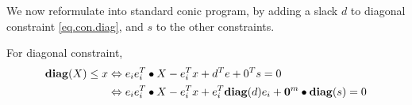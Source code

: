 \documentclass[../main]{subfiles}
\begin{document}




We now reformulate into standard conic program, by adding a slack \(d\) to diagonal constraint \eqref{eq.con.diag}, and \(s\) to the other constraints.


For diagonal constraint,
\begin{align*}
    \mathbf{diag}(X) \le x & \Leftrightarrow e_ie_i^T \bullet X - e_i^T x + d^Te + 0^Ts = 0                                 \\
                   & \Leftrightarrow e_ie_i^T \bullet X - e_i^T x + e_i^T\mathbf{diag}(d)e_i + \bm 0^m \bullet \mathbf{diag}(s) = 0
\end{align*}
\end{document}
